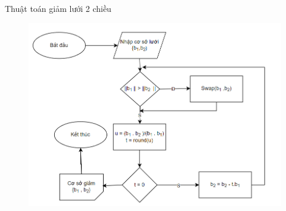 \documentclass{beamer}
\numberwithin{equation}{section}
\begin{document}
\begin{frame}{Thuật toán giảm lưới 2 chiều}

\begin{figure}[h]
\centering
\includegraphics[scale = 0.6]{pictures/thuat_toan_giam_luoi_2_chieu.png}
\end{figure}

\end{frame}
\end{document}
